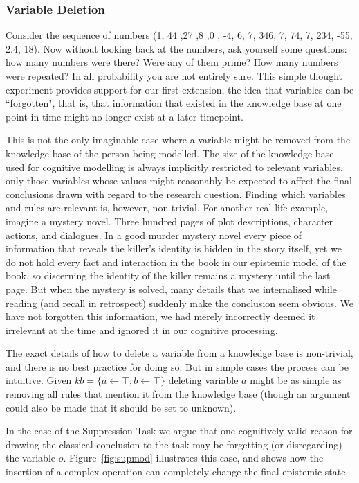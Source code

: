 \documentclass{article}
\begin{document}
\subsubsection*{Variable Deletion}

Consider the sequence of numbers (1, 44 ,27 ,8 ,0 , -4, 6, 7, 346, 7, 74, 7, 234, -55, 2.4, 18). Now without looking back at the numbers, ask yourself some questions: how many numbers were there? Were any of them prime? How many numbers were repeated? In all probability you are not entirely sure. This simple thought experiment provides support for our first extension, the idea that variables can be ``forgotten", that is, that information that existed in the knowledge base at one point in time might no longer exist at a later timepoint. 

This is not the only imaginable case where a variable might be removed from the knowledge base of the person being modelled. The size of the knowledge base used for cognitive modelling is always implicitly restricted to relevant variables, only those variables whose values might reasonably be expected to affect the final conclusions drawn with regard to the research question. Finding which variables and rules are relevant is, however, non-trivial. For another real-life example, imagine a mystery novel. Three hundred pages of plot descriptions, character actions, and dialogues. In a good murder mystery novel every piece of information that reveals the killer's identity is hidden in the story itself, yet we do not hold every fact and interaction in the book in our epistemic model of the book, so discerning the identity of the killer remains a mystery until the last page. But when the mystery is solved, many details that we internalised while reading (and recall in retrospect) suddenly make the conclusion seem obvious. We have not forgotten this information, we had merely incorrectly deemed it irrelevant at the time and ignored it in our cognitive processing.

The exact details of how to delete a variable from a knowledge base is non-trivial, and there is no best practice for doing so. But in simple cases the process can be intuitive. Given $kb=\{a\leftarrow\top, b\leftarrow \top\}$ deleting variable $a$ might be as simple as removing all rules that mention it from the knowledge base (though an argument could also be made that it should be set to unknown).

In the case of the Suppression Task we argue that one cognitively valid reason for drawing the classical conclusion to the task may be forgetting (or disregarding) the variable $o$. Figure~\ref{fig:supmod} illustrates this case, and shows how the insertion of a complex operation can completely change the final epistemic state.
\end{document}
